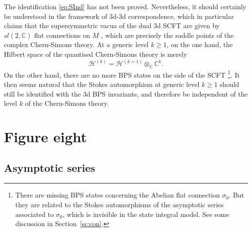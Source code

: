 \documentclass[a4paper,11pt]{article}	%
\def\mc{\mathcal}
\def\IC{\mathbb{C}}
\newcommand{\s}{\sigma}
\begin{document}
The identification \eqref{eq:SInd} has not been proved. Nevertheless,
it should certainly be understood in the framework of 3d-3d
correspondence, which in particular claims that the supersymmetric
vacua of the dual 3d SCFT are given by $sl(2,\IC)$ flat connections on
$M$ \cite{Dimofte:2010tz}, which are precisely the saddle points of
the complex Chern-Simons theory.
At a generic level $k\geq 1$, on the one hand, the Hilbert space of the
quantised Chern-Simons theory is merely \cite{Dimofte:2014zga}
\begin{equation}
  \mc{H}^{(k)} = \mc{H}^{(k=1)}\otimes_\IC \IC^k.
\end{equation}
On the other hand, there are no more BPS states on the side of the
SCFT \footnote{There are missing BPS states concerning the Abelian
  flat connection $\s_0$. But they are related to the Stokes
  automorphisms of the asymptotic series associated to $\s_0$, which
  is invisible in the state integral model.  See some discussion in
  Section~\ref{sc:con}.}.  It then seems natural that the Stokes
automorphism at generic level $k\geq 1$ should still be identified
with the 3d BPS invariants, and therefore be independent of the level
$k$ of the Chern-Simons theory.


\section{Figure eight}
\label{sc:41}

\subsection{Asymptotic series}
\label{sc:41.asymp}
\end{document}
